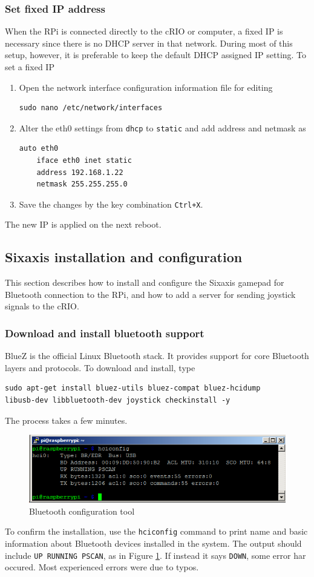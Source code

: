 \subsubsection{Set fixed IP address}
When the RPi is connected directly to the cRIO or computer, a fixed IP is necessary since there is no DHCP server in that network. During most of this setup, however, it is preferable to keep the default DHCP assigned IP setting. To set a fixed IP
\begin{enumerate}
	\item Open the network interface configuration information file for editing\begin{verbatim}sudo nano /etc/network/interfaces\end{verbatim}
	\item Alter the eth0 settings from \texttt{dhcp} to \texttt{static} and
	add address and netmask as\begin{verbatim}auto eth0
	iface eth0 inet static
	address 192.168.1.22
	netmask 255.255.255.0\end{verbatim}
	\item Save the changes by the key combination \texttt{Ctrl+X}.
\end{enumerate}
The new IP is applied on the next reboot.

\subsection{Sixaxis installation and configuration}
This section describes how to install and configure the Sixaxis gamepad for Bluetooth connection to the RPi, and how to add a server for sending joystick signals to the cRIO.
\subsubsection{Download and install bluetooth support}
BlueZ is the official Linux Bluetooth stack. It provides support for core Bluetooth layers and protocols. To download and install, type
\begin{verbatim}sudo apt-get install bluez-utils bluez-compat bluez-hcidump
libusb-dev libbluetooth-dev joystick checkinstall -y\end{verbatim}
The process takes a few minutes.
\begin{figure}[htb!]
	\centering \includegraphics[scale=0.45]{fig/rpi_hciconfig} \caption{Bluetooth configuration tool}
	\label{fig: RPi hciconfig} 
\end{figure}
To confirm the installation, use the \texttt{hciconfig} command to print name and basic information about Bluetooth devices installed in the system. The output should include \texttt{UP RUNNING PSCAN}, as in Figure \ref{fig: RPi hciconfig}. If instead it says \texttt{DOWN}, some error har occured. Most experienced errors were due to typos.

